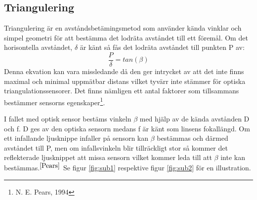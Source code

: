 \documentclass[a4paper,12pt,fleqn]{article}
\begin{document}
\subsection{Triangulering}
Triangulering är en avståndsbetämingsmetod som använder kända vinklar och simpel geometri för att bestämma det lodräta avståndet till ett föremål.
Om det horisontella avståndet, \begin{math}\delta\end{math} är känt så fås det lodräta avståndet till punkten P av:
\begin{equation}
\label{eq:angle}
\frac{P}{\delta}=tan(\beta)
\end{equation}
Denna ekvation kan vara missledande då den ger intrycket av att det inte finns maximal och minimal uppmätbar distans vilket tyvärr inte stämmer för optiska triangulationssensorer.
Det finns nämligen ett antal faktorer som tillsammans bestämmer sensorns egenskaper\footnote{\label{Pears}N. E. Pears, 1994}.

I fallet med optisk sensor bestäms vinkeln \begin{math}\beta\end{math} med hjälp av de kända avstånden D och f. D ges av den optiska sensorn medans f är känt som linsens fokallängd. Om ett infallande ljusknippe infaller på sensorn kan \begin{math}\beta\end{math} bestämmas och därmed avståndet till P, men om  infallsvinkeln blir tillräckligt stor så kommer det reflekterade ljusknippet att missa sensorn vilket kommer leda till att \begin{math}\beta\end{math} inte kan bestämmas.$^{\ref{Pears}}$ Se figur \ref{fig:sub1} respektive figur \ref{fig:sub2} för en illustration.
\end{document}
